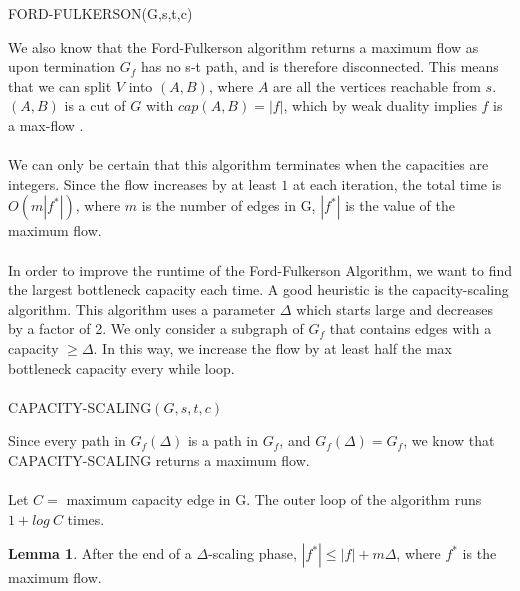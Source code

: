 \documentclass{article}
\theoremstyle{plain}
\theoremstyle{definition}
\newtheorem{lemma}[dummytwo]{Lemma}
\begin{document}
        FORD-FULKERSON(G,s,t,c)
        \begin{algorithmic}[1]
            \EndWhile
        \end{algorithmic}
        We also know that the Ford-Fulkerson algorithm returns a maximum flow as upon termination $G_f$ has no s-t path, and is therefore disconnected. This means that we can split $V$ into $(A, B)$, where $A$ are all the vertices reachable from $s$. $(A, B)$ is a cut of $G$ with $cap(A, B) = |f|$, which by weak duality implies $f$ is a max-flow .
        \\ \\
        We can only be certain that this algorithm terminates when the capacities are integers. Since the flow increases by at least $1$ at each iteration, the total time is $O(m|f^*|)$, where $m$ is the number of edges in G, $|f^*|$ is the value of the maximum flow. \\ \\
        In order to improve the runtime of the Ford-Fulkerson Algorithm, we want to find the largest bottleneck capacity each time. A good heuristic is the capacity-scaling algorithm. This algorithm uses a parameter $\Delta$ which starts large and decreases by a factor of 2. We only consider a subgraph of $G_f$ that contains edges with a capacity $\geq \Delta$. In this way, we increase the flow by at least half the max bottleneck capacity every while loop. \\ \\
        CAPACITY-SCALING$(G,s,t,c)$
        \begin{algorithmic}[1]
                \EndWhile
            \EndWhile
        \end{algorithmic}
        Since every path in $G_f(\Delta)$ is a path in $G_f$, and $G_f(\Delta) = G_f$, we know that CAPACITY-SCALING returns a maximum flow. \\ \\
        Let $C =$ maximum capacity edge in G. The outer loop of the algorithm runs $1 + log \ C$ times.
        \begin{lemma}
            After the end of a $\Delta$-scaling phase, $|f^*| \leq |f| + m \Delta$, where $f^*$ is the maximum flow.
        
        \end{lemma}
        
\end{document}
